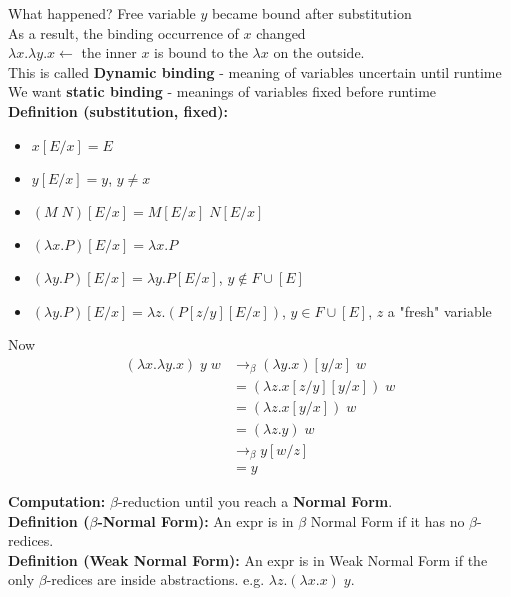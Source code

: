 \documentclass[11pt]{article}
\begin{document}
What happened? Free variable $y$ became bound after substitution \\

As a result, the binding occurrence of $x$ changed \\

$\lambda x.\lambda y.x \leftarrow$ the inner $x$ is bound to the $\lambda x$ on the outside. \\

This is called {\bf Dynamic binding} - meaning of variables uncertain until runtime \\

We want {\bf static binding} - meanings of variables fixed before runtime \\

\textbf{Definition (substitution, fixed):}
\begin{itemize}
	\item[] $x[E/x] = E$
	\item[] $y[E/x] = y$, $y \neq x$
	\item[] $(M\;N)[E/x] = M[E/x]\;N[E/x]$
	\item[] $(\lambda x.P)[E/x] = \lambda x.P$
	\item[] $(\lambda y.P)[E/x] = \lambda y. P[E/x]$, $y \notin F \cup [E]$
	\item[] $(\lambda y.P)[E/x] = \lambda z.(P[z/y][E/x])$, $y \in F \cup [E]$, $z$ a "fresh" variable
\end{itemize}

Now 
\begin{align*}
(\lambda x.\lambda y.x)\;y\;w &\rightarrow_\beta (\lambda y.x)[y/x]\;w \\
&= (\lambda z.x[z/y][y/x])\;w \\
&= (\lambda z.x[y/x])\;w \\
&= (\lambda z.y)\;w \\
&\rightarrow_\beta y[w/z] \\
&= y
\end{align*}

{\bf Computation:} $\beta$-reduction until you reach a {\bf Normal Form}. \\

\textbf{Definition ($\beta$-Normal Form):} An expr is in $\beta$ Normal Form if it has no $\beta$-redices. \\

\textbf{Definition (Weak Normal Form):} An expr is in Weak Normal Form if the only $\beta$-redices are inside abstractions. e.g. $\lambda z.(\lambda x.x)\;y$. \\
\end{document}
